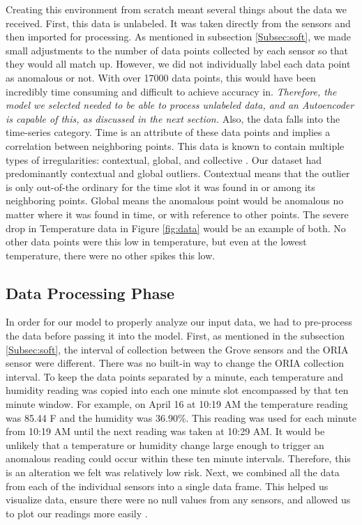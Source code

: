 Creating this environment from scratch meant several things about the data we received. First, this data is unlabeled. It was taken directly from the sensors and then imported for processing. As mentioned in subsection \ref{Subsec:soft}, we made small adjustments to the number of data points collected by each sensor so that they would all match up. However, we did not individually label each data point as anomalous or not. With over 17000 data points, this would have been incredibly time consuming and difficult to achieve accuracy in. \textit{Therefore, the model we selected needed to be able to process unlabeled data, and an Autoencoder is capable of this, as discussed in the next section.} Also, the data falls into the time-series category. Time is an attribute of these data points and implies a correlation between neighboring points. This data is known to contain multiple types of irregularities: contextual, global, and collective \cite{anodot}. Our dataset had predominantly contextual and global outliers. Contextual means that the outlier is only out-of-the ordinary for the time slot it was found in or among its neighboring points. Global means the anomalous point would be anomalous no matter where it was found in time, or with reference to other points. The severe drop in Temperature data in Figure \ref{fig:data} would be an example of both. No other data points were this low in temperature, but even at the lowest temperature, there were no other spikes this low. 

\subsection{Data Processing Phase}
\label{subsec:dp}
In order for our model to properly analyze our input data, we had to pre-process the data before passing it into the model. First, as mentioned in the subsection \ref{Subsec:soft}, the interval of collection between the Grove sensors and the ORIA sensor were different. There was no built-in way to change the ORIA collection interval. To keep the data points separated by a minute, each temperature and humidity reading was copied into each one minute slot encompassed by that ten minute window. For example, on April 16 at 10:19 AM the temperature reading was 85.44 F and the humidity was 36.90\%. This reading was used for each minute from 10:19 AM until the next reading was taken at 10:29 AM. It would be unlikely that a temperature or humidity change large enough to trigger an anomalous reading could occur within these ten minute intervals. Therefore, this is an alteration we felt was relatively low risk. Next, we combined all the data from each of the individual sensors into a single data frame. This helped us visualize data, ensure there were no null values from any sensors, and allowed us to plot our readings more easily \cite{df}.

